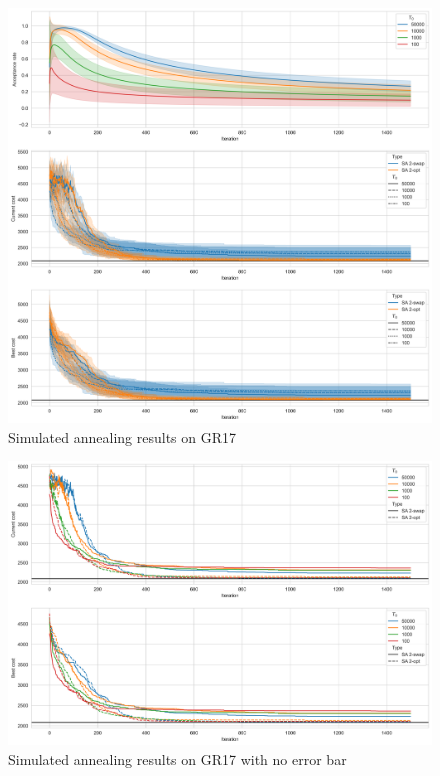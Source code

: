 \begin{figure}
    \centering
    \includegraphics[height=0.5\textheight]{images/gr17_sa.png}
    \caption{Simulated annealing results on GR17}
    \label{fig:gr17-sa}
\end{figure}

\begin{figure}
    \centering
    \includegraphics[height=0.4\textheight]{images/gr17-no-error.png}
    \caption{Simulated annealing results on GR17 with no error bar}
    \label{fig:gr17-ne}
\end{figure}

